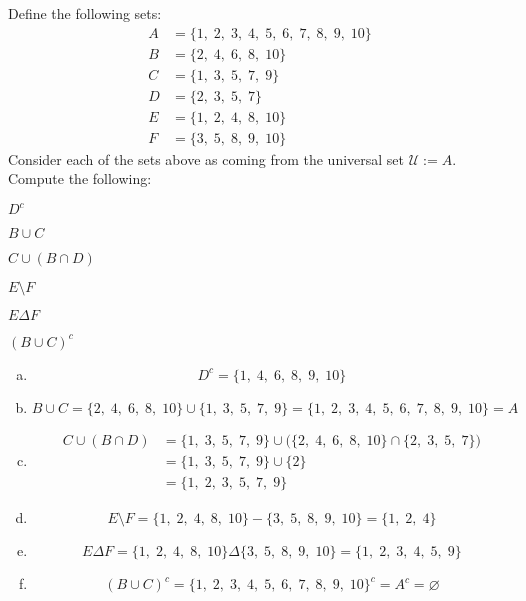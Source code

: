 \documentclass[11pt,letterpaper]{article}
\begin{document}
\newpage



 Define the following sets:
	\[
	\begin{aligned}
	A&= \{ 1, \; 2, \; 3, \; 4, \; 5, \; 6, \; 7, \; 8, \; 9, \; 10 \} \\
	B&= \{ 2, \; 4, \; 6, \; 8, \; 10 \} \\
	C&= \{ 1, \; 3, \; 5, \; 7, \; 9 \} \\
	D&= \{ 2, \; 3, \; 5, \; 7 \} \\
	E&= \{ 1, \; 2, \; 4, \; 8, \; 10 \} \\
	F&= \{ 3, \; 5, \; 8, \; 9, \; 10 \}
	\end{aligned}
	\]
Consider each of the sets above as coming from the universal set $\mathcal{U}:= A$. Compute the following:
	\begin{2enumerate}
	\item $D^c$
	\item $B \cup C$
	\item $C \cup (B \cap D)$
	\item $E \setminus F$
	\item $E \Delta F$
	\item $(B \cup C)^c$
	\end{2enumerate} \pspace

\sol
\begin{enumerate}[(a)]
\item 
	\[
	D^c= \{ 1, \; 4, \; 6, \; 8, \; 9, \; 10 \} 
	\] \pspace

\item 
	\[
	B \cup C=  \{ 2, \; 4, \; 6 , \; 8, \; 10 \} \cup  \{ 1, \; 3, \; 5, \; 7, \; 9 \}= \{ 1, \; 2, \; 3, \; 4, \; 5, \; 6, \; 7, \; 8, \; 9, \; 10 \}= A
	\] \pspace

\item 
	\[
	\begin{aligned}
	C \cup (B \cap D)&=  \{ 1, \; 3, \; 5, \; 7, \; 9 \} \cup \big( \{ 2, \; 4, \; 6 , \; 8, \; 10 \} \cap \{ 2, \; 3, \; 5, \; 7 \} \big) \\[0.3cm]
	&= \{ 1, \; 3, \; 5, \; 7, \; 9 \} \cup \{ 2 \} \\[0.3cm]
	&= \{ 1, \; 2, \; 3, \; 5, \; 7, \; 9 \}
	\end{aligned}
	\] \pspace

\item 
	\[
	E \setminus F= \{ 1, \; 2, \; 4, \; 8, \; 10 \} - \{ 3, \; 5, \; 8, \; 9, \; 10 \}= \{ 1, \; 2, \; 4 \}
	\] \pspace

\item 
	\[
	E \Delta F= \{ 1, \; 2, \; 4, \; 8, \; 10 \} \Delta \{ 3, \; 5, \; 8, \; 9, \; 10 \}= \{ 1, \; 2, \; 3, \; 4, \; 5, \; 9 \} 
	\] \pspace

\item 
	\[
	(B \cup C)^c= \{ 1, \; 2, \; 3, \; 4, \; 5, \; 6, \; 7, \; 8, \; 9, \; 10 \}^c= A^c= \varnothing
	\]
\end{enumerate}
\end{document}
